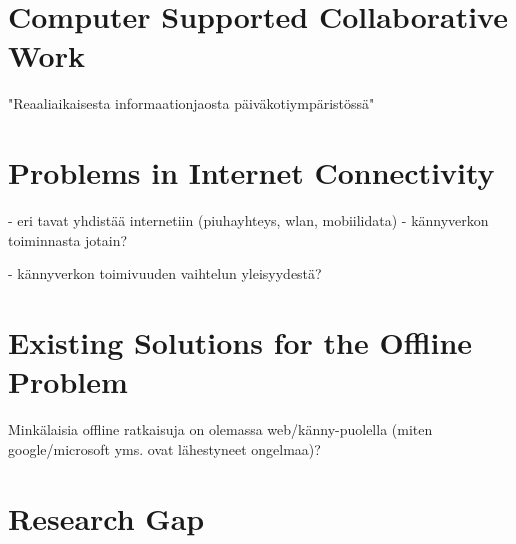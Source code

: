 \section{Computer Supported Collaborative Work}
"Reaaliaikaisesta informaationjaosta päiväkotiympäristössä"



\section{Problems in Internet Connectivity}
 - eri tavat yhdistää internetiin (piuhayhteys, wlan, mobiilidata)
 - kännyverkon toiminnasta jotain?

 - kännyverkon toimivuuden vaihtelun yleisyydestä? 




\section{Existing Solutions for the Offline Problem}
Minkälaisia offline ratkaisuja on olemassa web/känny-puolella (miten google/microsoft yms. ovat lähestyneet ongelmaa)?



\section{Research Gap}
